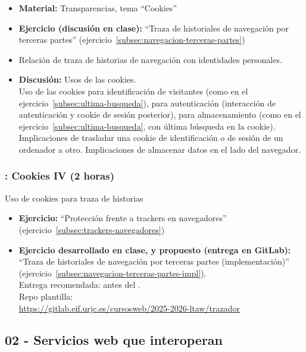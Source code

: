\documentclass[a4paper,12pt]{article}
\begin{document}
\begin{itemize}
  \item \textbf{Material:} Transparencias, tema ``Cookies''
  \item \textbf{Ejercicio (discusión en clase):} ``Traza de historiales de navegación por terceras partes'' (ejercicio~\ref{subsec:navegacion-terceras-partes})
\item Relación de traza de historias de navegación con identidades personales.
\item \textbf{Discusión:} Usos de las cookies. \\
  Uso de las cookies para identificación de visitantes (como en el ejercicio~\ref{subsec:ultima-busqueda}), para autenticación (interacción de autenticación y cookie de sesión posterior), para almacenamiento (como en el ejercicio~\ref{subsec:ultima-busqueda}, con última búsqueda en la cookie). Implicaciones de trasladar una cookie de identificación o de sesión de un ordenador a otro. Implicaciones de almacenar datos en el lado del navegador.
\end{itemize}

\subsubsection{\martesD: Cookies IV (2 horas)}
\label{cal:martesD}

Uso de cookies para traza de historias

\begin{itemize}
\item \textbf{Ejercicio:} ``Protección frente a trackers en navegadores'' (ejercicio~\ref{subsec:trackers-navegadores})
\item \textbf{Ejercicio desarrollado en clase, y propuesto (entrega en GitLab):} ``Traza de historiales de navegación por terceras partes (implementación)'' (ejercicio~\ref{subsec:navegacion-terceras-partes-impl}). \\
  Entrega recomendada: antes del \martesE. \\
  Repo plantilla: \\ {\footnotesize \url{https://gitlab.eif.urjc.es/cursosweb/2025-2026-ltaw/trazador}}
\end{itemize}

\subsection{02 - Servicios web que interoperan}
\end{document}
